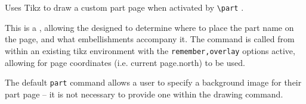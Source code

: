 \begin{macrolist}
				{\label{Macro:DrawPartPage}
					Uses Tikz to draw a custom part page when activated by \verb|\part| .
				}
				{
				}
				{
					This is a \placeholderCommand{}, allowing the designed to determine where to place the part name on the page, and what embellishments accompany it. The command is called from within an existing tikz environment with the \verb|remember,overlay| options active, allowing for page coordinates (i.e. current page.north) to be used.

					The default \verb|part| command allows a user to specify a background image for their part page -- it is not necessary to provide one within the drawing command.
				}
			
		\end{macrolist}
	
